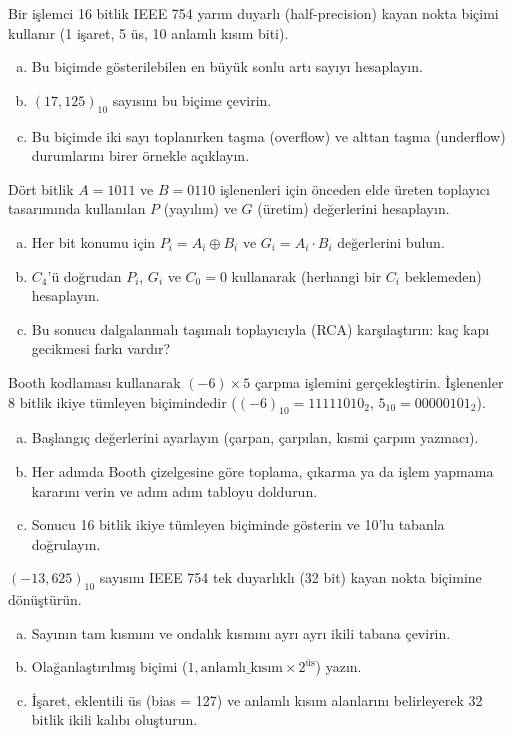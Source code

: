 \begin{alistirma}[\zor]
Bir işlemci 16 bitlik IEEE 754 yarım duyarlı (half-precision) kayan nokta biçimi kullanır (1 işaret, 5 üs, 10 anlamlı kısım biti).
\begin{enumerate}[(a)]
\item Bu biçimde gösterilebilen en büyük sonlu artı sayıyı hesaplayın.
\item $(17{,}125)_{10}$ sayısını bu biçime çevirin.
\item Bu biçimde iki sayı toplanırken taşma (overflow) ve alttan taşma (underflow) durumlarını birer örnekle açıklayın.
\end{enumerate}
\end{alistirma}

\begin{alistirma}[\orta]
Dört bitlik $A = 1011$ ve $B = 0110$ işlenenleri için önceden elde üreten toplayıcı tasarımında kullanılan $P$ (yayılım) ve $G$ (üretim) değerlerini hesaplayın.
\begin{enumerate}[(a)]
\item Her bit konumu için $P_i = A_i \oplus B_i$ ve $G_i = A_i \cdot B_i$ değerlerini bulun.
\item $C_4$'ü doğrudan $P_i$, $G_i$ ve $C_0 = 0$ kullanarak (herhangi bir $C_i$ beklemeden) hesaplayın.
\item Bu sonucu dalgalanmalı taşımalı toplayıcıyla (RCA) karşılaştırın: kaç kapı gecikmesi farkı vardır?
\end{enumerate}
\end{alistirma}

\begin{alistirma}[\zor]
Booth kodlaması kullanarak $(-6) \times 5$ çarpma işlemini gerçekleştirin. İşlenenler 8 bitlik ikiye tümleyen biçimindedir ($(-6)_{10} = 11111010_2$, $5_{10} = 00000101_2$).
\begin{enumerate}[(a)]
\item Başlangıç değerlerini ayarlayın (çarpan, çarpılan, kısmi çarpım yazmacı).
\item Her adımda Booth çizelgesine göre toplama, çıkarma ya da işlem yapmama kararını verin ve adım adım tabloyu doldurun.
\item Sonucu 16 bitlik ikiye tümleyen biçiminde gösterin ve 10'lu tabanla doğrulayın.
\end{enumerate}
\end{alistirma}

\begin{alistirma}[\orta]
$(-13{,}625)_{10}$ sayısını IEEE 754 tek duyarlıklı (32 bit) kayan nokta biçimine dönüştürün.
\begin{enumerate}[(a)]
\item Sayının tam kısmını ve ondalık kısmını ayrı ayrı ikili tabana çevirin.
\item Olağanlaştırılmış biçimi ($1{,}\text{anlamlı\_kısım} \times 2^{\text{üs}}$) yazın.
\item İşaret, eklentili üs (bias = 127) ve anlamlı kısım alanlarını belirleyerek 32 bitlik ikili kalıbı oluşturun.
\end{enumerate}
\end{alistirma}

